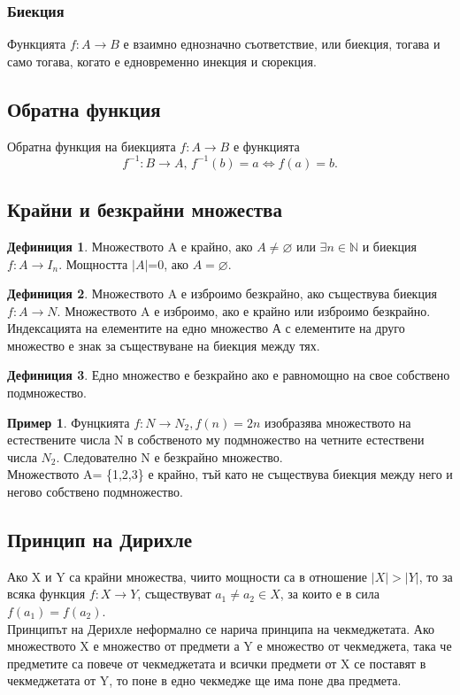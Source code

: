 \documentclass[fleqn, 12pt]{article}
\theoremstyle{definition}
\newtheorem{example}{Пример}[subsection]
\newtheorem{definition}{Дефиниция}[subsection]
\begin{document}
\subsubsection{Биекция}
Функцията $f: A \to B$ е взаимно еднозначно съответствие, или биекция, тогава и само тогава, когато е едновременно инекция и сюрекция.

\subsection{Обратна функция}
Обратна функция на биекцията $f: A \to B$ е функцията 
$$f^{-1}:B \to A, \, f^{-1}(b) = a \Leftrightarrow f(a) = b.$$

\subsection{Крайни и безкрайни множества}

\begin{definition}
Множеството A е крайно, ако $ A \neq \varnothing $ или $\exists n \in \mathbb{N} $ и биекция $f: A \to I_n$. Мощността $\vert A \vert $=0, ако $ A = \varnothing $.
\end{definition}

\begin{definition}
Множеството A е изброимо безкрайно, ако съществува биекция $f: A \to N$. Множеството A е изброимо, ако е крайно или изброимо безкрайно. \\
Индексацията на елементите на едно множество А с елементите на друго множество е знак за съществуване на биекция между тях. 
\end{definition}

\begin{definition}
Едно множество е безкрайно ако е равномощно на свое собствено подмножество.
\end{definition}

\begin{example}
Фунцкията $f: N \to N_2, f(n) = 2n$ изобразява множеството на естествените числа N в собственото му подмножество на четните естествени числа $N_2$. Следователно 
N е безкрайно множество. \\
Множеството A= \{1,2,3\} е крайно, тъй като не съществува биекция между него и негово собствено подмножество.
\end{example}

\subsection{Принцип на Дирихле}
Ако X и Y са крайни множества, чиито мощности са в отношение $ \vert X \vert > \vert Y \vert $, то за всяка функция $f: X \to Y$, съществуват $a_1 \neq a_2 \in X$, за които е в сила $f(a_1)=f(a_2)$.\\
Принципът на Дерихле неформално се нарича принципа на чекмеджетата. Ако множеството X е множество от предмети а Y е множество от чекмеджета, така че предметите са повече от чекмеджетата и всички предмети от X се поставят в чекмеджетата от Y, то поне в едно чекмедже ще има поне два предмета.
\end{document}
